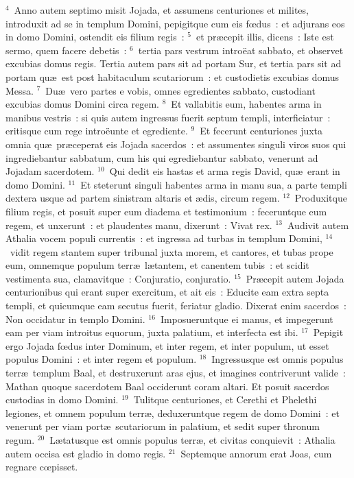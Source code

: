 ${}^{4}$~Anno autem septimo misit Jojada, et assumens centuriones et milites, introduxit ad se in templum Domini, pepigitque cum eis fœdus~: et adjurans eos in domo Domini, ostendit eis filium regis~:
${}^{5}$~et pr\ae cepit illis, dicens~: Iste est sermo, quem facere debetis~:
${}^{6}$~tertia pars vestrum intro\"eat sabbato, et observet excubias domus regis. Tertia autem pars sit ad portam Sur, et tertia pars sit ad portam qu\ae\ est post habitaculum scutariorum~: et custodietis excubias domus Messa.
${}^{7}$~Du\ae\ vero partes e vobis, omnes egredientes sabbato, custodiant excubias domus Domini circa regem.
${}^{8}$~Et vallabitis eum, habentes arma in manibus vestris~: si quis autem ingressus fuerit septum templi, interficiatur~: eritisque cum rege intro\"eunte et egrediente.
${}^{9}$~Et fecerunt centuriones juxta omnia qu\ae\ pr\ae ceperat eis Jojada sacerdos~: et assumentes singuli viros suos qui ingrediebantur sabbatum, cum his qui egrediebantur sabbato, venerunt ad Jojadam sacerdotem.
${}^{10}$~Qui dedit eis hastas et arma regis David, qu\ae\ erant in domo Domini.
${}^{11}$~Et steterunt singuli habentes arma in manu sua, a parte templi dextera usque ad partem sinistram altaris et \ae dis, circum regem.
${}^{12}$~Produxitque filium regis, et posuit super eum diadema et testimonium~: feceruntque eum regem, et unxerunt~: et plaudentes manu, dixerunt~: Vivat rex.
${}^{13}$~Audivit autem Athalia vocem populi currentis~: et ingressa ad turbas in templum Domini,
${}^{14}$~vidit regem stantem super tribunal juxta morem, et cantores, et tubas prope eum, omnemque populum terr\ae\ l\ae tantem, et canentem tubis~: et scidit vestimenta sua, clamavitque~: Conjuratio, conjuratio.
${}^{15}$~Pr\ae cepit autem Jojada centurionibus qui erant super exercitum, et ait eis~: Educite eam extra septa templi, et quicumque eam secutus fuerit, feriatur gladio. Dixerat enim sacerdos~: Non occidatur in templo Domini.
${}^{16}$~Imposueruntque ei manus, et impegerunt eam per viam introitus equorum, juxta palatium, et interfecta est ibi.
${}^{17}$~Pepigit ergo Jojada fœdus inter Dominum, et inter regem, et inter populum, ut esset populus Domini~: et inter regem et populum.
${}^{18}$~Ingressusque est omnis populus terr\ae\ templum Baal, et destruxerunt aras ejus, et imagines contriverunt valide~: Mathan quoque sacerdotem Baal occiderunt coram altari. Et posuit sacerdos custodias in domo Domini.
${}^{19}$~Tulitque centuriones, et Cerethi et Phelethi legiones, et omnem populum terr\ae , deduxeruntque regem de domo Domini~: et venerunt per viam port\ae\ scutariorum in palatium, et sedit super thronum regum.
${}^{20}$~L\ae tatusque est omnis populus terr\ae , et civitas conquievit~: Athalia autem occisa est gladio in domo regis.
${}^{21}$~Septemque annorum erat Joas, cum regnare cœpisset.

